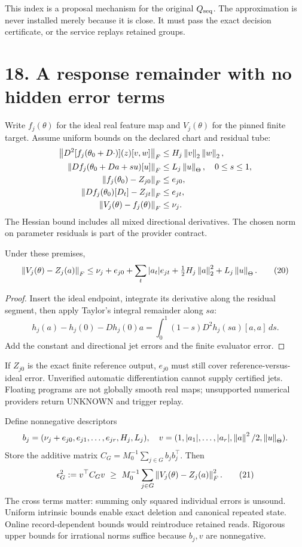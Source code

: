 This index is a proposal mechanism for the original $Q_{\rm seq}$. The approximation is never installed merely because it is close. It must pass the exact decision certificate, or the service replays retained groups.

\newpage
\section*{18. A response remainder with no hidden error terms}
Write $f_j(\theta)$ for the ideal real feature map and $V_j(\theta)$ for the pinned finite target. Assume uniform bounds on the declared chart and residual tube:
\begin{align*}
 \left\|D^2[f_j(\theta_0+D\cdot)](z)[v,w]\right\|_F&\leq H_j\left\|v\right\|_2\left\|w\right\|_2,\\
 \left\|Df_j(\theta_0+Da+su)[u]\right\|_F&\leq L_j\left\|u\right\|_\Theta,\quad 0\leq s\leq1,\\
 \left\|f_j(\theta_0)-Z_{j0}\right\|_F&\leq e_{j0},\\
 \left\|Df_j(\theta_0)[D_t]-Z_{jt}\right\|_F&\leq e_{jt},\\
 \left\|V_j(\theta)-f_j(\theta)\right\|_F&\leq\nu_j.
\end{align*}
The Hessian bound includes all mixed directional derivatives. The chosen norm on parameter residuals is part of the provider contract.

\begin{theorem}
Under these premises,
\[
 \left\|V_j(\theta)-Z_j(a)\right\|_F
 \leq \nu_j+e_{j0}+\sum_t|a_t|e_{jt}
       +\tfrac12H_j\left\|a\right\|_2^2+L_j\left\|u\right\|_\Theta. \tag{20}
\]
\end{theorem}
\begin{proof}
Insert the ideal endpoint, integrate its derivative along the residual segment, then apply Taylor's integral remainder along $sa$:
\[
 h_j(a)-h_j(0)-Dh_j(0)a
 =\int_0^1(1-s)D^2h_j(sa)[a,a]\,ds.
\]
Add the constant and directional jet errors and the finite evaluator error.
\end{proof}
If $Z_{j0}$ is the exact finite reference output, $e_{j0}$ must still cover reference-versus-ideal error. Unverified automatic differentiation cannot supply certified jets. Floating programs are not globally smooth real maps; unsupported numerical providers return UNKNOWN and trigger replay.

 Define nonnegative descriptors
\[
 b_j=(\nu_j+e_{j0},e_{j1},\ldots,e_{jr},H_j,L_j),\quad
 v=(1,|a_1|,\ldots,|a_r|,\left\|a\right\|^2/2,\left\|u\right\|_\Theta).
\]
Store the additive matrix $C_G=M_0^{-1}\sum_{j\in G}b_jb_j^\top$. Then
\[
 \epsilon_G^2:=v^\top C_Gv\ \geq\ M_0^{-1}\sum_{j\in G}\norm{V_j(\theta)-Z_j(a)}_F^2. \tag{21}
\]
The cross terms matter: summing only squared individual errors is unsound. Uniform intrinsic bounds enable exact deletion and canonical repeated state. Online record-dependent bounds would reintroduce retained reads. Rigorous upper bounds for irrational norms suffice because $b_j,v$ are nonnegative.

